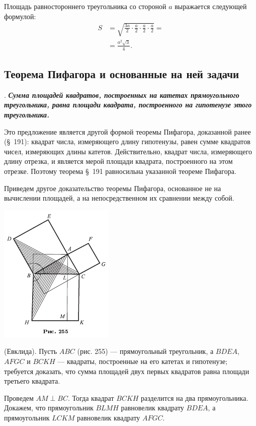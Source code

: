 \documentclass[oneside]{book}
\begin{document}
Площадь равностороннего треугольника со стороной $a$ выражается следующей формулой:
\begin{align*}S&=\sqrt{\frac{3a}2\cdot \frac a2\cdot \frac a2\cdot \frac a2}=
 \\
 &=\frac{a^2\sqrt{3}}{4}.
\end{align*}


\subsection*{Теорема Пифагора и основанные на ней задачи}

.
\textbf{\emph{Сумма площадей квадратов, построенных на катетах прямоугольного треугольника, равна площади квадрата, построенного на гипотенузе этого треугольника.}}

Это предложение является другой формой теоремы Пифагора, доказанной ранее (§~191):
квадрат числа, измеряющего длину гипотенузы, равен сумме квадратов чисел, измеряющих длины катетов.
Действительно, квадрат числа, измеряющего длину отрезка, и является мерой площади квадрата, построенного на этом отрезке.
Поэтому теорема §~191 равносильна указанной теореме Пифагора.

Приведем другое доказательство теоремы Пифагора, основанное не на вычислении площадей, а на непосредственном их сравнении между собой.

\includegraphics{pics/ris-255}

 (Евклида).
Пусть $ABC$ (рис. 255) — прямоугольный треугольник, а $BDEA$, $AFGC$ и $BCKH$ — квадраты, построенные на его катетах и гипотенузе;
требуется доказать, что сумма площадей двух первых квадратов равна площади третьего квадрата.

Проведем $AM\perp BC$.
Тогда квадрат $BCKH$ разделится на два прямоугольника.
Докажем, что прямоугольник $BLMH$ равновелик квадрату $BDEA$, а прямоугольник $LCKM$ равновелик квадрату $AFGC$.
\end{document}
